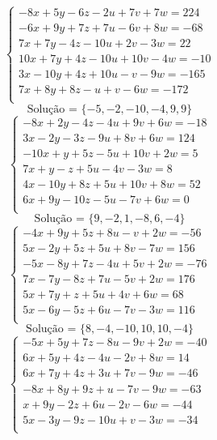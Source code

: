 \documentclass[12pt,oneside,a4paper]{article}
\begin{document}
\vspace{\baselineskip}
\begin{equation*}
\begin{cases}
-8x+5y-6z-2u+7v+7w=224 \\
-6x+9y+7z+7u-6v+8w=-68 \\
7x+7y-4z-10u+2v-3w=22 \\
10x+7y+4z-10u+10v-4w=-10 \\
3x-10y+4z+10u-v-9w=-165 \\
7x+8y+8z-u+v-6w=-172 \\
\end{cases}
\end{equation*}
\begin{equation*}
\text{Solução = }\{-5,-2,-10,-4,9,9\}
\end{equation*}
\vspace{\baselineskip}
\begin{equation*}
\begin{cases}
-8x+2y-4z-4u+9v+6w=-18 \\
3x-2y-3z-9u+8v+6w=124 \\
-10x+y+5z-5u+10v+2w=5 \\
7x+y-z+5u-4v-3w=8 \\
4x-10y+8z+5u+10v+8w=52 \\
6x+9y-10z-5u-7v+6w=0 \\
\end{cases}
\end{equation*}
\begin{equation*}
\text{Solução = }\{9,-2,1,-8,6,-4\}
\end{equation*}
\vspace{\baselineskip}
\begin{equation*}
\begin{cases}
-4x+9y+5z+8u-v+2w=-56 \\
5x-2y+5z+5u+8v-7w=156 \\
-5x-8y+7z-4u+5v+2w=-76 \\
7x-7y-8z+7u-5v+2w=176 \\
5x+7y+z+5u+4v+6w=68 \\
5x-6y-5z+6u-7v-3w=116 \\
\end{cases}
\end{equation*}
\begin{equation*}
\text{Solução = }\{8,-4,-10,10,10,-4\}
\end{equation*}
\vspace{\baselineskip}
\begin{equation*}
\begin{cases}
-5x+5y+7z-8u-9v+2w=-40 \\
6x+5y+4z-4u-2v+8w=14 \\
6x+7y+4z+3u+7v-9w=-46 \\
-8x+8y+9z+u-7v-9w=-63 \\
x+9y-2z+6u-2v-6w=-44 \\
5x-3y-9z-10u+v-3w=-34 \\
\end{cases}
\end{equation*}
\end{document}
